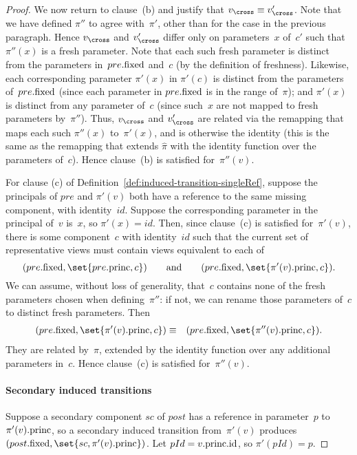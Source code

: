 \begin{proof}
We now return to clause~(b) and justify that $v_\cross \equiv v_\cross'$.
Note that we have defined $\pi''$ to agree with~$\pi'$, other than for the
case in the previous paragraph.  Hence $v_\cross$ and $v_\cross'$ differ only
on parameters~$x$ of~$c'$ such that $\pi''(x)$ is a fresh parameter.  Note
that each such fresh parameter is distinct from the parameters in~$pre.\mathrm{fixed}$
and~$c$ (by the definition of freshness).
%
Likewise, each corresponding parameter $\pi'(x)$ in $\pi'(c)$ is distinct from
the parameters of~$pre.\mathrm{fixed}$ (since each parameter in $pre.\mathrm{fixed}$ is in the
range of~$\pi$); and $\pi'(x)$ is distinct from any parameter of~$c$ (since
such~$x$ are not mapped to fresh parameters by~$\pi''$).
%
Thus, $v_\cross$ and $v_\cross'$ are related via the remapping that maps
each such $\pi''(x)$ to~$\pi'(x)$, and is otherwise the identity (this is the
same as the remapping that extends $\hat\pi$ with the identity function over
the parameters of~$c$).  Hence clause~(b) is satisfied for~$\pi''(v)$.

For clause (c) of Definition~\ref{def:induced-transition-singleRef}, suppose
the principals of $pre$ and $\pi'(v)$ both have a reference to the same
missing component, with identity~$id$.  Suppose the corresponding parameter in
the principal of~$v$ is~$x$, so $\pi'(x) = id$.  Then, since clause~(c) is
satisfied for~$\pi'(v)$, there is some component~$c$ with identity~$id$ such
that the current set of representative views must contain views equivalent to
each of
\[
(pre.\fixed, \set{pre.\princ, c}) \qquad\mbox{and}\qquad
(pre.\fixed, \set{\pi'(v).\princ, c}).
\]
We can assume, without loss of generality, that~$c$ contains none of the fresh
parameters chosen when defining~$\pi''$: if not, we can rename those
parameters of~$c$ to distinct fresh parameters.  Then
\begin{eqnarray*}
(pre.\fixed, \set{\pi'(v).\princ, c}) & \equiv & 
  (pre.\fixed, \set{\pi''(v).\princ, c}).
\end{eqnarray*}
They are related by~$\hat\pi$, extended by the identity function over any
additional parameters in~$c$.  Hence clause~(c) is satisfied for~$\pi''(v)$.

\paragraph{Secondary induced transitions}

Suppose a secondary component $sc$ of $post$ has a reference in parameter~$p$
to~$\pi'(v).\mathrm{princ}$, so a secondary induced transition from~$\pi'(v)$ produces
$(post.\fixed, \set{sc, \pi'(v).\princ})$.  Let $pId = v.\mathrm{princ}.\mathrm{id}$, so
$\pi'(pId) = p$.


\end{proof}
